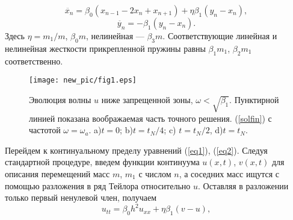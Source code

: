 \begin{equation}
\ddot{x_n}=\beta_0 (x_{n-1}-2x_n+x_{n+1})+\eta \beta_1 (y_n-x_n), 
\label{eq1}
\end{equation}
\begin{equation}
\ddot{y_n}=-\beta_1 (y_n-x_n). \label{eq2}
\end{equation}
Здесь $ \eta = m_1 / m $,  $ \beta_0 m $, нелинейная --- $ \beta_3 m $. Соответствующие линейная и нелинейная жесткости прикрепленной пружины равны $ \beta_1 m_1 $, $ \beta_2 m_1 $ соответственно. 
\begin{figure*}[h]
\begin{center}
\texttt{[image: new\_pic/fig1.eps]}
\end{center}
\caption{ Эволюция волны $ u $ ниже запрещенной зоны, $\omega<\sqrt{\beta_1}$. Пунктирной линией показана воображаемая часть точного решения. (\ref{solfin}) с частотой $\omega=\omega_a$.  a)$t=0$; b)$ t=t_N/4$; c) $t=t_N/2$, d)$t=t_N$.}
\label{fg1}
  \end{figure*}
Перейдем к континуальному пределу уравнений (\ref {eq1}), (\ref {eq2}). Следуя стандартной процедуре, введем функции континуума $ u(x, t) $, $ v(x, t) $ для описания перемещений масс $ m $, $ m_1 $ с числом $ n $, а  соседних масс ищутся с помощью разложения в ряд Тейлора относительно $ u $. Оставляя в разложении только первый ненулевой член, получаем
\begin{equation}
u_{tt}=\beta_0 h^2 u_{xx}+\eta \beta_1 (v-u), \label{eq3}
\end{equation}
